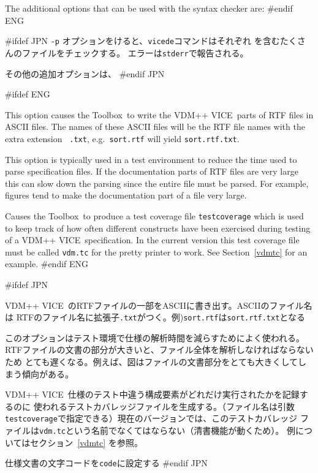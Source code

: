 \documentclass[\pformat,12pt]{article}
\newcommand{\vdmslpp}{VDM-SL}
\newcommand{\Toolbox}{Toolbox}
\newcommand{\vdmde}{vdmde}
\newcommand{\vdmslpp}{VDM++}
\newcommand{\Toolbox}{Toolbox}
\newcommand{\vdmde}{vppde}
\renewcommand{\vdmslpp}{VDM++ VICE}
\renewcommand{\vdmde}{vicede}
\newcommand{\aaa}{\tt }
\begin{document}
The additional options that can be used with the syntax checker are:
#endif ENG

#ifdef JPN
{\tt -p} オプションをけると、{\tt \vdmde}コマンドはそれぞれ
を含むたくさんのファイルをチェックする。
エラーは{\aaa stderr}で報告される。

その他の追加オプションは、
#endif JPN

\begin{description}
#ifdef ENG
\item[{\tt -w}] This option causes the \Toolbox\ to write the
  \vdmslpp\ parts of RTF files in ASCII files. The names of these
  ASCII files will be the RTF file names with the extra extension {\tt
    .txt}, e.g.\ {\tt sort.rtf} will yield {\tt sort.rtf.txt}.
  
  This option is typically used in a test environment to reduce the
  time used to parse specification files. If the documentation parts
  of RTF files are very large this can slow down the parsing since
  the entire file must be parsed. For example, figures tend to make the
  documentation part of a file very large.

\item[{\tt -R}] Causes the \Toolbox\ to produce a test coverage file
  {\tt testcoverage} which is used to keep track of how often different
  constructs have been exercised during testing of a \vdmslpp\ 
  specification. In the current version this test coverage file must
  be called {\tt vdm.tc} for the pretty printer to work.  See
  Section~\ref{vdmtc} for an example.
#endif ENG

#ifdef JPN
\item[{\tt -w}]
   \vdmslpp\ のRTFファイルの一部をASCIIに書き出す。ASCIIのファイル名は
  RTFのファイル名に拡張子{\tt .txt}がつく。例){\tt sort.rtf}は{\tt sort.rtf.txt}となる

  このオプションはテスト環境で仕様の解析時間を減らすためによく使われる。
  RTFファイルの文書の部分が大きいと、ファイル全体を解析しなければならないため
  とても遅くなる。例えば、図はファイルの文書部分をとても大きくしてしまう傾向がある。

\item[{\tt -R}]
   \vdmslpp\ 仕様のテスト中違う構成要素がどれだけ実行されたかを記録するのに
  使われるテストカバレッジファイルを生成する。（ファイル名は引数
  {\tt testcoverage}で指定できる）現在のバージョンでは、このテストカバレッジ
  ファイルは{\tt vdm.tc}という名前でなくてはならない（清書機能が動くため）。
  例についてはセクション~\ref{vdmtc} を参照。

\item[{\tt -W code}] 仕様文書の文字コードを{\tt code}に設定する
#endif JPN
\end{description}
\end{document}
